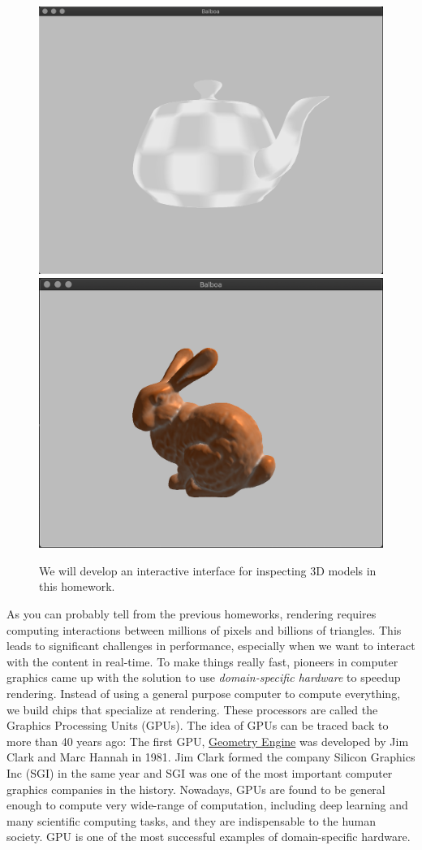 




\begin{figure}[ht]
    \centering
    \includegraphics[width=0.40\linewidth]{imgs/hw_3_3_teapot.png}
    \includegraphics[width=0.40\linewidth]{imgs/hw_3_4_bunny.png}
    \caption{We will develop an interactive interface for inspecting 3D models in this homework.}
    \label{fig:teaser}
\end{figure}

As you can probably tell from the previous homeworks, rendering requires computing interactions between millions of pixels and billions of triangles. This leads to significant challenges in performance, especially when we want to interact with the content in real-time. To make things really fast, pioneers in computer graphics came up with the solution to use \emph{domain-specific hardware} to speedup rendering. Instead of using a general purpose computer to compute everything, we build chips that specialize at rendering. These processors are called the Graphics Processing Units (GPUs). The idea of GPUs can be traced back to more than 40 years ago: The first GPU, \href{https://www.computer.org/publications/tech-news/chasing-pixels/geometry-engine}{Geometry Engine} was developed by Jim Clark and Marc Hannah in 1981. Jim Clark formed the company Silicon Graphics Inc (SGI) in the same year and SGI was one of the most important computer graphics companies in the history. Nowadays, GPUs are found to be general enough to compute very wide-range of computation, including deep learning and many scientific computing tasks, and they are indispensable to the human society. GPU is one of the most successful examples of domain-specific hardware.

